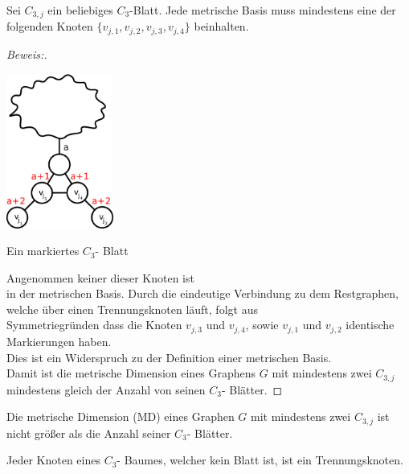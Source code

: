 \begin{lem}
Sei $C_{3,j}$ ein beliebiges $C_{3}$-Blatt. Jede metrische Basis muss mindestens eine der folgenden Knoten $\{v_{j,1},v_{j,2},v_{j,3},v_{j,4}\}$ beinhalten.
\end{lem}
\begin{proof}[Beweis:]~
\par
\vspace{-2mm}
\begin{floatingfigure}[l]{200pt}
{\flushleft
\hspace*{1.7cm}
\includegraphics[width=100pt]{bilder/beweis.pdf}}
\caption{Ein markiertes $C_{3}$- Blatt}
\end{floatingfigure}
Angenommen keiner dieser Knoten ist\\in der metrischen Basis. Durch die eindeutige Verbindung zu dem Restgraphen, welche über einen Trennungsknoten läuft, folgt aus\\Symmetriegründen dass die Knoten $v_{j,3}$ und $v_{j,4}$, sowie $v_{j,1}$ und $v_{j,2}$ identische Markierungen haben.\\Dies ist ein Widerspruch zu der Definition einer metrischen Basis.\\
Damit ist die metrische Dimension eines Graphens $G$ mit mindestens zwei $C_{3,j}$\\mindestens gleich der Anzahl von seinen $C_{3}$- Blätter.
\end{proof}
\par
\vspace{+3mm}
\begin{lem}
Die metrische Dimension (MD) eines Graphen $G$ mit mindestens zwei $C_{3,j}$ ist nicht größer als die Anzahl seiner $C_{3}$- Blätter. 
\end{lem}
\begin{lem}
\label{bkb}
Jeder Knoten eines $C_{3}$- Baumes, welcher kein Blatt ist, ist ein Trennungsknoten.
\end{lem}


